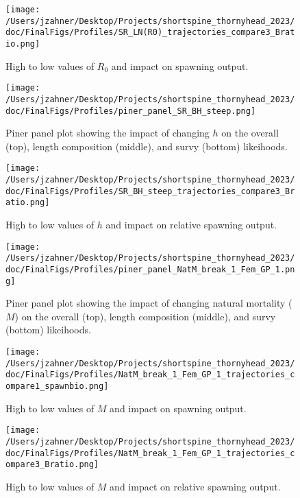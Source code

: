 \documentclass[11pt,
  english,
  letterpaper,
]{article}
\begin{document}
\begin{figure}
\centering
\texttt{[image: /Users/jzahner/Desktop/Projects/shortspine\_thornyhead\_2023/doc/FinalFigs/Profiles/SR\_LN(R0)\_trajectories\_compare3\_Bratio.png]}
\caption{High to low values of \(R_0\) and impact on spawning output.\label{fig:R0_spawnout}}
\end{figure}

\begin{figure}
\centering
\texttt{[image: /Users/jzahner/Desktop/Projects/shortspine\_thornyhead\_2023/doc/FinalFigs/Profiles/piner\_panel\_SR\_BH\_steep.png]}
\caption{Piner panel plot showing the impact of changing \(h\) on the overall (top), length composition (middle), and survy (bottom) likeihoods.\label{fig:h_piner_prof}}
\end{figure}

\begin{figure}
\centering
\texttt{[image: /Users/jzahner/Desktop/Projects/shortspine\_thornyhead\_2023/doc/FinalFigs/Profiles/SR\_BH\_steep\_trajectories\_compare3\_Bratio.png]}
\caption{High to low values of \(h\) and impact on relative spawning output.\label{fig:h_spawnout}}
\end{figure}

\begin{figure}
\centering
\texttt{[image: /Users/jzahner/Desktop/Projects/shortspine\_thornyhead\_2023/doc/FinalFigs/Profiles/piner\_panel\_NatM\_break\_1\_Fem\_GP\_1.png]}
\caption{Piner panel plot showing the impact of changing natural mortality (\(M\)) on the overall (top), length composition (middle), and survy (bottom) likeihoods.\label{fig:M_prof}}
\end{figure}

\begin{figure}
\centering
\texttt{[image: /Users/jzahner/Desktop/Projects/shortspine\_thornyhead\_2023/doc/FinalFigs/Profiles/NatM\_break\_1\_Fem\_GP\_1\_trajectories\_compare1\_spawnbio.png]}
\caption{High to low values of \(M\) and impact on spawning output.\label{fig:M_spawnout}}
\end{figure}

\begin{figure}
\centering
\texttt{[image: /Users/jzahner/Desktop/Projects/shortspine\_thornyhead\_2023/doc/FinalFigs/Profiles/NatM\_break\_1\_Fem\_GP\_1\_trajectories\_compare3\_Bratio.png]}
\caption{High to low values of \(M\) and impact on relative spawning output.\label{fig:M_relspawnout}}
\end{figure}
\end{document}
